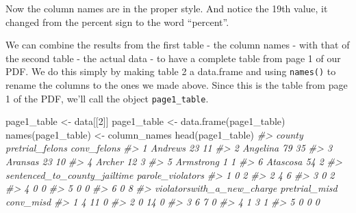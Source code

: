 \documentclass[
  12pt,
  openany]{book}
\newenvironment{Shaded}{\begin{snugshade}}{\end{snugshade}}
\newcommand{\CommentTok}[1]{\textcolor[rgb]{0.37,0.37,0.37}{\textit{#1}}}
\newcommand{\DecValTok}[1]{\textcolor[rgb]{0.06,0.06,0.06}{#1}}
\newcommand{\FunctionTok}[1]{\textcolor[rgb]{0,0,0}{#1}}
\newcommand{\NormalTok}[1]{#1}
\newcommand{\OtherTok}[1]{\textcolor[rgb]{0.37,0.37,0.37}{#1}}
\begin{document}
Now the column names are in the proper style. And notice the 19th value, it changed from the percent sign to the word ``percent''.

We can combine the results from the first table - the column names - with that of the second table - the actual data - to have a complete table from page 1 of our PDF. We do this simply by making table 2 a data.frame and using \texttt{names()} to rename the columns to the ones we made above. Since this is the table from page 1 of the PDF, we'll call the object \texttt{page1\_table}.

\begin{Shaded}
\begin{Highlighting}[]
\NormalTok{page1\_table }\OtherTok{\textless{}{-}}\NormalTok{ data[[}\DecValTok{2}\NormalTok{]]}
\NormalTok{page1\_table }\OtherTok{\textless{}{-}} \FunctionTok{data.frame}\NormalTok{(page1\_table)}
\FunctionTok{names}\NormalTok{(page1\_table) }\OtherTok{\textless{}{-}}\NormalTok{ column\_names}
\FunctionTok{head}\NormalTok{(page1\_table)}
\CommentTok{\#\textgreater{}      county pretrial\_felons conv\_felons}
\CommentTok{\#\textgreater{} 1   Andrews              23          11}
\CommentTok{\#\textgreater{} 2  Angelina              79          35}
\CommentTok{\#\textgreater{} 3   Aransas              23          10}
\CommentTok{\#\textgreater{} 4    Archer              12           3}
\CommentTok{\#\textgreater{} 5 Armstrong               1           1}
\CommentTok{\#\textgreater{} 6  Atascosa              54           2}
\CommentTok{\#\textgreater{}   sentenced\_to\_county\_jailtime parole\_violators}
\CommentTok{\#\textgreater{} 1                            0                2}
\CommentTok{\#\textgreater{} 2                            4                6}
\CommentTok{\#\textgreater{} 3                            0                2}
\CommentTok{\#\textgreater{} 4                            0                0}
\CommentTok{\#\textgreater{} 5                            0                0}
\CommentTok{\#\textgreater{} 6                            0                8}
\CommentTok{\#\textgreater{}   violatorswith\_a\_new\_charge pretrial\_misd conv\_misd}
\CommentTok{\#\textgreater{} 1                          4            11         0}
\CommentTok{\#\textgreater{} 2                          0            14         0}
\CommentTok{\#\textgreater{} 3                          6             7         0}
\CommentTok{\#\textgreater{} 4                          1             3         1}
\CommentTok{\#\textgreater{} 5                          0             0         0}

\end{Highlighting}
\end{Shaded}
\end{document}
